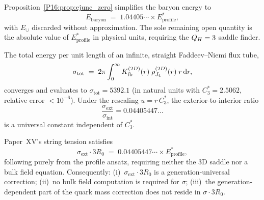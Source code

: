 \begin{remark}
\label{P16:rem:ejunc_consequence}
Proposition~\ref{P16:prop:ejunc_zero} simplifies the baryon energy to
\begin{equation}
  \boxed{E_{\mathrm{baryon}} \;=\; 1.04405\cdots\times E_{\mathrm{profile}}^*,}
\end{equation}
with $E_\cup$ discarded without approximation. The sole remaining open
quantity is the absolute value of $E_{\mathrm{profile}}^*$ in physical
units, requiring the $Q_H=3$ saddle finder.
\end{remark}

\begin{proposition}
\label{P16:prop:sigma_tot}
The total energy per unit length of an infinite, straight Faddeev--Niemi
flux tube,
\begin{equation}
  \sigma_{\mathrm{tot}}
  \;=\; 2\pi\int_0^\infty K_{\mathrm{fb}}^{(2D)}(r)\;\rho_{J_4}^{(2D)}(r)\;r\,\mathrm{d}r,
\end{equation}
converges and evaluates to $\sigma_{\mathrm{tot}} = 5392.1$ (in natural
units with $C_3^*=2.5062$, relative error $<10^{-6}$). Under the
rescaling $u=r\,C_3^*$, the exterior-to-interior ratio
\begin{equation}
  \frac{\sigma_{\mathrm{ext}}}{\sigma_{\mathrm{int}}} = 0.04405447\ldots
\end{equation}
is a universal constant independent of $C_3^*$.
\end{proposition}

\begin{proposition}
\label{P16:prop:sigma_ext_formula}
Paper~XV's string tension satisfies
\begin{equation}
  \sigma_{\mathrm{ext}} \cdot 3R_0
  \;=\; 0.04405447\cdots \times E_{\mathrm{profile}}^*,
\end{equation}
following purely from the profile ansatz, requiring neither the 3D saddle
nor a bulk field equation. Consequently: (i)~$\sigma_{\mathrm{ext}}\cdot3R_0$
is a generation-universal correction; (ii)~no bulk field computation is
required for $\sigma$; (iii)~the generation-dependent part of the quark
mass correction does not reside in $\sigma\cdot3R_0$.
\end{proposition}

